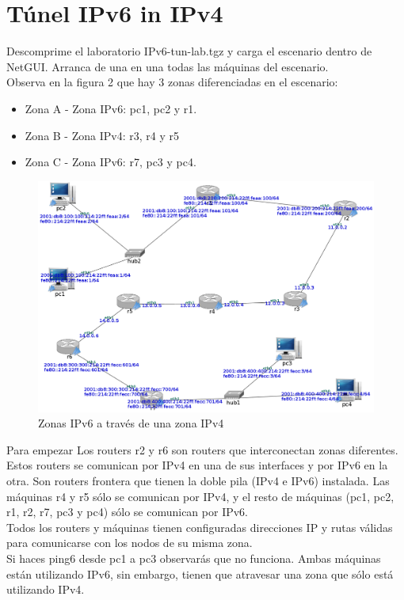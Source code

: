 \documentclass[12pt, a4paper]{report}
\begin{document}
\chapter{Túnel IPv6 in IPv4}
Descomprime el laboratorio IPv6-tun-lab.tgz y carga el escenario dentro de NetGUI. Arranca
de una en una todas las máquinas del escenario.\\
Observa en la figura 2 que hay 3 zonas diferenciadas en el escenario:
\begin{itemize}
	\item Zona A - Zona IPv6: pc1, pc2 y r1.
	\item Zona B - Zona IPv4: r3, r4 y r5
	\item Zona C - Zona IPv6: r7, pc3 y pc4.
\end{itemize}
\begin{figure}[h]
	\centering
	\includegraphics[width=1\textwidth]{fig2}
	\caption{Zonas IPv6 a través de una zona IPv4}
\end{figure}
Para empezar 
Los routers r2 y r6 son routers que interconectan zonas diferentes. Estos routers se comunican
por IPv4 en una de sus interfaces y por IPv6 en la otra. Son routers frontera que tienen la doble pila
(IPv4 e IPv6) instalada. Las máquinas r4 y r5 sólo se comunican por IPv4, y el resto de máquinas
(pc1, pc2, r1, r2, r7, pc3 y pc4) sólo se comunican por IPv6.\\

Todos los routers y máquinas tienen configuradas direcciones IP y rutas válidas para comunicarse
con los nodos de su misma zona.\\

Si haces ping6 desde pc1 a pc3 observarás que no funciona. Ambas máquinas están utilizando
IPv6, sin embargo, tienen que atravesar una zona que sólo está utilizando IPv4.\\
\end{document}

